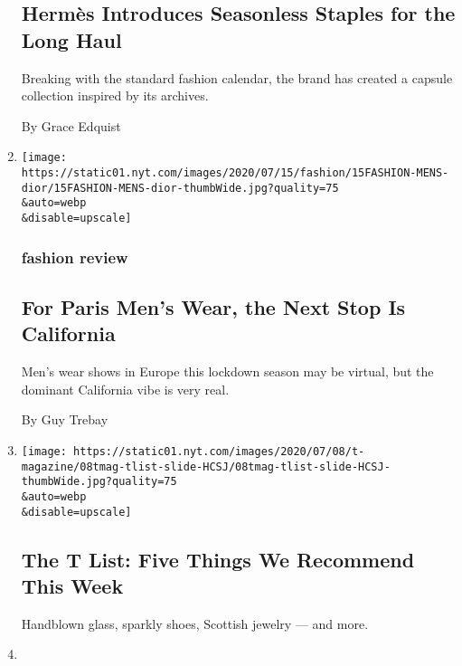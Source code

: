 \begin{enumerate}
  \hypertarget{hermuxe8s-introduces-seasonless-staples-for-the-long-haul}{%
  \subsection{Hermès Introduces Seasonless Staples for the Long
  Haul}\label{hermuxe8s-introduces-seasonless-staples-for-the-long-haul}}

  Breaking with the standard fashion calendar, the brand has created a
  capsule collection inspired by its archives.

  By Grace Edquist
\item
  \href{/2020/07/15/style/mens-fashion-for-paris-mens-wear-next-stop-california.html}{}

  \texttt{[image: https://static01.nyt.com/images/2020/07/15/fashion/15FASHION-MENS-dior/15FASHION-MENS-dior-thumbWide.jpg?quality=75\\\&auto=webp\\\&disable=upscale]}

  \hypertarget{fashion-review-1}{%
  \subsubsection{fashion review}\label{fashion-review-1}}

  \hypertarget{for-paris-mens-wear-the-next-stop-is-california}{%
  \subsection{For Paris Men's Wear, the Next Stop Is
  California}\label{for-paris-mens-wear-the-next-stop-is-california}}

  Men's wear shows in Europe this lockdown season may be virtual, but
  the dominant California vibe is very real.

  By Guy Trebay
\item
  \href{/2020/07/09/t-magazine/robert-longo-quarantine-films.html}{}

  \texttt{[image: https://static01.nyt.com/images/2020/07/08/t-magazine/08tmag-tlist-slide-HCSJ/08tmag-tlist-slide-HCSJ-thumbWide.jpg?quality=75\\\&auto=webp\\\&disable=upscale]}

  \hypertarget{the-t-list-five-things-we-recommend-this-week-2}{%
  \subsection{The T List: Five Things We Recommend This
  Week}\label{the-t-list-five-things-we-recommend-this-week-2}}

  Handblown glass, sparkly shoes, Scottish jewelry --- and more.
\item
  \href{/2020/07/06/style/game-of-thrones-iris-van-herpen-couture.html}{}


\end{enumerate}
